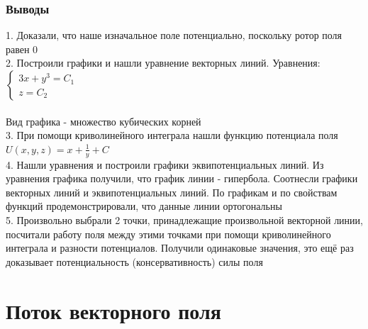 \documentclass{article}
\begin{document}
                \subsubsection{Выводы}
                1. Доказали, что наше изначальное поле потенциально, поскольку ротор поля равен 0\\
                2. Построили графики и нашли уравнение векторных линий. Уравнения:\\
                $\begin{cases}
                    3x + y^3 = C_1 \\
                    z = C_2
                \end{cases}$\\\\
                Вид графика - множество кубических корней\\
                3. При помощи криволинейного интеграла нашли функцию потенциала поля $U(x, y, z) = x + \frac{1}{y} + C$\\
                4. Нашли уравнения и построили графики эквипотенциальных линий. Из уравнения графика получили, что график линии - гипербола. Соотнесли графики векторных линий и эквипотенциальных линий. По графикам и по свойствам функций продемонстрировали, что данные линии ортогональны\\
                5. Произвольно выбрали 2 точки, принадлежащие произвольной векторной линии, посчитали работу поля между этими точками при помощи криволинейного интеграла и разности потенциалов. Получили одинаковые значения, это ещё раз доказывает потенциальность (консервативность) силы поля
                \newpage
    \section{Поток векторного поля}
\end{document}
